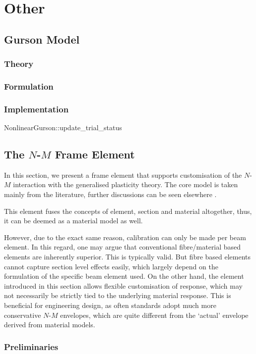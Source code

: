 \chapter{Other}
\section{Gurson Model}
\subsection{Theory}
\subsection{Formulation}
\subsection{Implementation}
\begin{cppcode}
NonlinearGurson::update_trial_status
\end{cppcode}
\section{The \texorpdfstring{$N$-$M$}{N-M} Frame Element}
In this section, we present a frame element that supports customisation of the $N$-$M$ interaction with the generalised plasticity theory. The core model is taken mainly from the literature, further discussions can be seen elsewhere \cite{Chang2023}.

This element fuses the concepts of element, section and material altogether, thus, it can be deemed as a material model as well.

However, due to the exact same reason, calibration can only be made per beam element.
In this regard, one may argue that conventional fibre/material based elements are inherently superior.
This is typically valid.
But fibre based elements cannot capture section level effects easily, which largely depend on the formulation of the specific beam element used.
On the other hand, the element introduced in this section allows flexible customisation of response, which may not necessarily be strictly tied to the underlying material response.
This is beneficial for engineering design, as often standards adopt much more conservative $N$-$M$ envelopes, which are quite different from the `actual' envelope derived from material models.
\subsection{Preliminaries}
